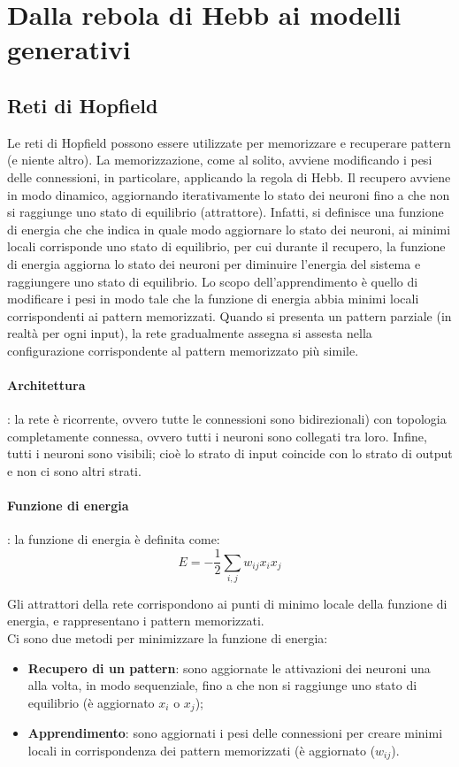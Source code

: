 \section{Dalla rebola di Hebb ai modelli generativi}

\subsection{Reti di Hopfield}

Le reti di Hopfield possono essere utilizzate per memorizzare e recuperare
pattern (e niente altro).
La memorizzazione, come al solito, avviene modificando i pesi delle connessioni,
in particolare, applicando la regola di Hebb. Il recupero avviene in modo
dinamico, aggiornando iterativamente lo stato dei neuroni fino a che non si
raggiunge uno stato di equilibrio (attrattore).
Infatti, si definisce una funzione di energia che che indica in quale modo
aggiornare lo stato dei neuroni, ai minimi locali corrisponde uno stato di
equilibrio, per cui durante il recupero, la funzione di energia aggiorna lo
stato dei neuroni per diminuire l'energia del sistema e raggiungere uno stato
di equilibrio.
Lo scopo dell'apprendimento è quello di modificare i pesi in modo tale che la
funzione di energia abbia minimi locali corrispondenti ai pattern memorizzati.
Quando si presenta un pattern parziale (in realtà per ogni input), la rete
gradualmente assegna si assesta nella configurazione corrispondente al pattern
memorizzato più simile.
\paragraph{Architettura}: la rete è ricorrente, ovvero tutte le connessioni sono
bidirezionali) con topologia completamente connessa, ovvero tutti i neuroni sono
collegati tra loro.
Infine, tutti i neuroni sono visibili; cioè lo strato di input coincide con lo
strato di output e non ci sono altri strati.

\paragraph{Funzione di energia}: la funzione di energia è definita come:
\begin{equation*}
	E = -\frac{1}{2} \sum_{i,j} w_{ij} x_i x_j
\end{equation*}

Gli attrattori della rete corrispondono ai punti di minimo locale della funzione
di energia, e rappresentano i pattern memorizzati.\\
Ci sono due metodi per minimizzare la funzione di energia:
\begin{itemize}
	\item \textbf{Recupero di un pattern}: sono aggiornate le attivazioni dei
		neuroni una alla volta, in modo sequenziale, fino a che non si raggiunge
		uno stato di equilibrio (è aggiornato $x_i$ o $x_j$);

	\item \textbf{Apprendimento}: sono aggiornati i pesi delle connessioni per
		creare minimi locali in corrispondenza dei pattern memorizzati (è 
		aggiornato ($w_{ij}$).
\end{itemize}

